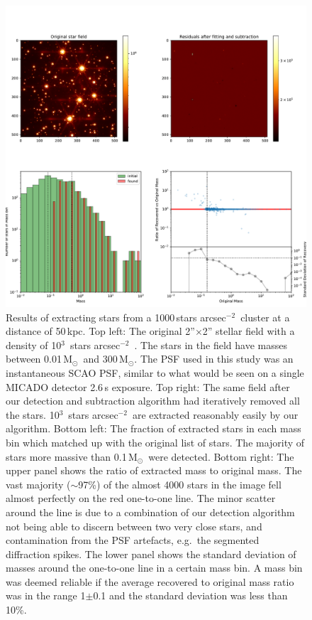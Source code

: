 \documentclass{aa}
\newcommand{\msun}{M$_\odot$~}
\newcommand{\msune}{M$_\odot$}
\newcommand{\s}{$\sim$}
\newcommand{\h}[1]{$^{#1}$}
\newcommand{\spa}{stars arcsec$^{-2}$~}
\begin{document}
\begin{appendix}
\begin{figure}
    \centering
    \includegraphics[width=\textwidth]{tbl_stats_dist=50000_rho=1000.pdf}
    \caption{Results of extracting stars from a 1000\,\spa cluster at a distance of 50\,kpc.
    Top left: The original 2''$\times$2'' stellar field with a density of 10\h3~\spa.
    The stars in the field have masses between 0.01\,\msun and 300\,\msune.
    The PSF used in this study was an instantaneous SCAO PSF, similar to what would be seen on a single MICADO detector 2.6\,s exposure.
    Top right: The same field after our detection and subtraction algorithm had iteratively removed all the stars.
    10\h3~\spa are extracted reasonably easily by our algorithm.
    Bottom left: The fraction of extracted stars in each mass bin which matched up with the original list of stars.
    The majority of stars more massive than 0.1\,\msun were detected.
    Bottom right: The upper panel shows the ratio of extracted mass to original mass.
    The vast majority (\s97\%) of the almost 4000 stars in the image fell almost perfectly on the red one-to-one line.
    The minor scatter around the line is due to a combination of our detection algorithm not being able to discern between two very close stars, and contamination from the PSF artefacts, e.g.\ the segmented diffraction spikes.
    The lower panel shows the standard deviation of masses around the one-to-one line in a certain mass bin.
    A mass bin was deemed reliable if the average recovered to original mass ratio was in the range 1$\pm$0.1 and the standard deviation was less than 10\%.}


\end{figure}
\end{appendix}
\end{document}
